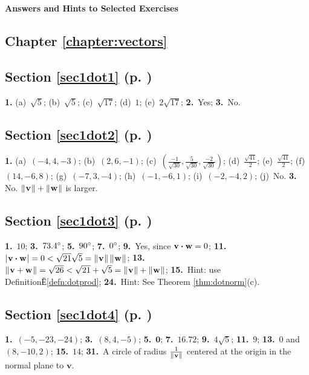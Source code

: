 \textsf{\textbf{\Large Answers and Hints to Selected Exercises}}
\begin{multicols}{2}
\section*{Chapter \ref{chapter:vectors}}
\subsection*{Section \ref{sec1dot1} (p. \pageref{sec1dot1})}
\textbf{1.} 
(a)~$\sqrt{5}$; \quad 
(b)~$\sqrt{5}$; \quad 
(c)~$\sqrt{17}$; \quad 
(d)~$1$;\quad
(e)~$2 \sqrt{17}$; \quad 
\textbf{2.}~Yes; \quad 
\textbf{3.}~No.
\subsection*{Section \ref{sec1dot2} (p. \pageref{sec1dot2})}
\textbf{1.} 
(a)~$(-4,4,-3)$; \quad 
(b)~$(2,6,-1)$;\quad
(c)~$\left ( \frac{-1}{\sqrt{30}},\frac{5}{\sqrt{30}},
\frac{-2}{\sqrt{30}}\right )$; \quad 
(d)~$\frac{\sqrt{41}}{2}$; \quad 
(e)~$\frac{\sqrt{41}}{2}$;\quad
(f)~$(14,-6,8)$; \quad
(g)~$(-7,3,-4)$; \quad
(h)~$(-1,-6,1)$; \quad 
(i)~$(-2,-4,2)$; \quad 
(j)~No.\quad
\textbf{3.} No. $\lVert\mspace{1mu}\textbf{v}\mspace{1mu}\rVert +
\lVert\mspace{1mu}\textbf{w}\mspace{1mu}\rVert$ is larger.

\subsection*{Section \ref{sec1dot3} (p. \pageref{sec1dot3})}
\textbf{1.}~$10$; \quad 
\textbf{3.}~$73.4^\circ$; \quad 
\textbf{5.}~$90^\circ$; \quad 
\textbf{7.}~$0^\circ$;\quad
\textbf{9.}~Yes, since $\textbf{v} \bm{\cdot} \textbf{w} = 0$;\quad
\textbf{11.}~$\lvert\mspace{1mu}\textbf{v} \bm{\cdot} \textbf{w}\mspace{1mu}\rvert =
0 < \sqrt{21}\sqrt{5} = \lVert\mspace{1mu}\textbf{v}\mspace{1mu}\rVert\,\lVert\mspace{1mu}\textbf{w}\mspace{1mu}\rVert$;\quad
\textbf{13.}~$\lVert\mspace{1mu}\textbf{v} + \textbf{w}\mspace{1mu}\rVert = \sqrt{26}
< \sqrt{21} + \sqrt{5} = \lVert\mspace{1mu}\textbf{v}\mspace{1mu}\rVert + \lVert\mspace{1mu}\textbf{w}\mspace{1mu}\rVert$;
\textbf{15.}~Hint: use DefinitionЁ\ref{defn:dotprod};\quad
\textbf{24.}~Hint: See Theorem \ref{thm:dotnorm}(c).

\subsection*{Section \ref{sec1dot4} (p. \pageref{sec1dot4})}
\textbf{1.}~$(-5,-23,-24)$; \quad 
\textbf{3.}~$(8,4,-5)$; \quad 
\textbf{5.}~$\textbf{0}$;\quad
\textbf{7.}~$16.72$; \quad
\textbf{9.}~$4\sqrt{5}$; \quad 
\textbf{11.}~$9$; \quad 
\textbf{13.}~$0$ and $(8,-10,2)$;\quad 
\textbf{15.}~$14$;\quad
\textbf{31.}~A circle of radius $\tfrac1{\lVert\mspace{1mu}\mathbf{v}\mspace{1mu}\rVert}$ centered at the origin in the normal plane to $\mathbf{v}$. 


\end{multicols}
